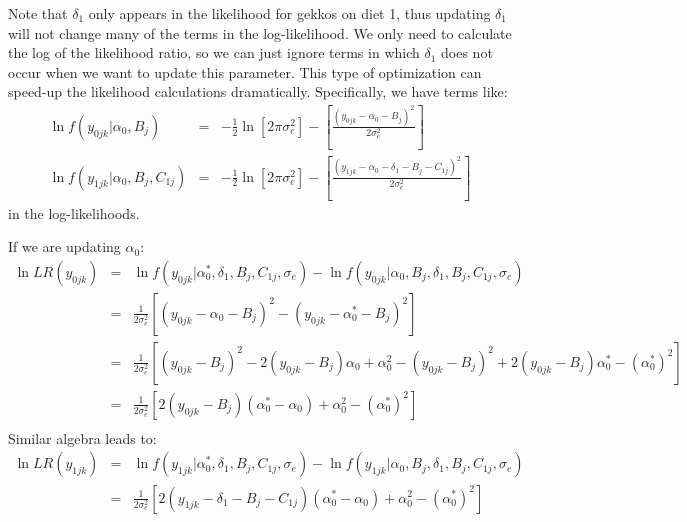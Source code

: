 \documentclass[11pt]{article}
\begin{document}
Note that $\delta_1$ only appears in the likelihood for gekkos on diet 1, thus updating $\delta_1$ will not change many of the terms in the log-likelihood.  
We only need to calculate the log of the likelihood ratio, so we can just ignore terms in which $\delta_1$ does not occur when we want to update this parameter. 
This type of optimization can speed-up the likelihood calculations dramatically.
Specifically, we have terms like:
\begin{eqnarray*}
\ln f(y_{0jk}|\alpha_0, B_j) & = &  -\frac{1}{2}\ln\left[2\pi\sigma_e^2\right] - \left[{\frac{\left(y_{0jk}-\alpha_0 - B_j\right)^2}{2\sigma_e^2}}\right] \\
\ln f(y_{1jk}|\alpha_0, B_j,  C_{1j}) & = &  -\frac{1}{2}\ln\left[2\pi\sigma_e^2\right] - \left[{\frac{\left(y_{1jk}  -\alpha_0 - \delta_1 - B_j - C_{1j}\right)^2}{2\sigma_e^2}}\right]
\end{eqnarray*}
in the log-likelihoods.

If we are updating $\alpha_0$:
\begin{eqnarray*}
\ln LR(y_{0jk}) & = &  \ln f(y_{0jk}|\alpha_0^{\ast},\delta_1, B_j,C_{1j},\sigma_e) - \ln f(y_{0jk}|\alpha_0, B_j,\delta_1, B_j,C_{1j},\sigma_e) \\
 & = &  \frac{1}{2\sigma_e^2}  \left[\left(y_{0jk}-\alpha_0 - B_j\right)^2 - \left(y_{0jk}-\alpha_0^\ast - B_j\right)^2\right] \\
		& = &  \frac{1}{2\sigma_e^2}  \left[\left(y_{0jk} - B_j\right)^2 - 2 \left(y_{0jk} - B_j\right)\alpha_0 + \alpha_0^2 - \left(y_{0jk} - B_j\right)^2 + 2 \left(y_{0jk} - B_j\right)\alpha_0^\ast - (\alpha_0^{\ast})^2\right] \\
		& = &  \frac{1}{2\sigma_e^2}  \left[2 \left(y_{0jk} - B_j\right)(\alpha_0^\ast - \alpha_0) + \alpha_0^2- (\alpha_0^{\ast})^2\right]\\
\end{eqnarray*}
Similar algebra leads to:
\begin{eqnarray*}
\ln LR(y_{1jk}) & = &  \ln f(y_{1jk}|\alpha_0^{\ast},\delta_1, B_j,C_{1j},\sigma_e) - \ln f(y_{1jk}|\alpha_0, B_j,\delta_1, B_j,C_{1j},\sigma_e) \\
		& = &  \frac{1}{2\sigma_e^2}  \left[2 \left(y_{1jk} -\delta_1 - B_j-C_{1j}\right)(\alpha_0^\ast - \alpha_0) + \alpha_0^2- (\alpha_0^{\ast})^2\right]\\
\end{eqnarray*}
\end{document}
